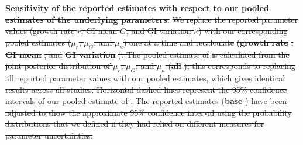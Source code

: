 \documentclass[12pt]{article}
\newcommand{\Ro}{\ensuremath{{\mathcal R}_{0}}\xspace}
\providecommand{\DIFdeltex}[1]{{\protect\color{red}\sout{#1}}}                      %
\providecommand{\DIFdelbegin}{} %
\providecommand{\DIFdelFL}[1]{\DIFdel{#1}} %
\providecommand{\DIFdel}[1]{\texorpdfstring{\DIFdeltex{#1}}{}} %
\newcommand{\DIFscaledelfig}{0.5}
\newlength{\DIFdelgraphicswidth} %
\newlength{\DIFdelgraphicsheight} %
\newcommand{\DIFdelincludegraphics}[2][]{%
\sbox{\DIFdelgraphicsbox}{\DIFOincludegraphics[#1]{#2}}%
\settoboxwidth{\DIFdelgraphicswidth}{\DIFdelgraphicsbox} %
\settoboxtotalheight{\DIFdelgraphicsheight}{\DIFdelgraphicsbox} %
\scalebox{\DIFscaledelfig}{%
\parbox[b]{\DIFdelgraphicswidth}{\usebox{\DIFdelgraphicsbox}\\[-\baselineskip] \rule{\DIFdelgraphicswidth}{0em}}\llap{\resizebox{\DIFdelgraphicswidth}{\DIFdelgraphicsheight}{%
\setlength{\unitlength}{\DIFdelgraphicswidth}%
\begin{picture}(1,1)%
\thicklines\linethickness{2pt} %
{\color[rgb]{1,0,0}\put(0,0){\framebox(1,1){}}}%
{\color[rgb]{1,0,0}\put(0,0){\line( 1,1){1}}}%
{\color[rgb]{1,0,0}\put(0,1){\line(1,-1){1}}}%
\end{picture}%
}\hspace*{3pt}}} %
} %
\DeclareRobustCommand{\DIFdelbegin}{\DIFOdelbegin \let\includegraphics\DIFdelincludegraphics} %
\begin{document}
\DIFdelbegin %
{%
\textbf{\DIFdelFL{Sensitivity of the reported }%
\DIFdelFL{estimates with respect to our pooled estimates of the underlying parameters.}}
\DIFdelFL{We replace the reported parameter values (growth rate $r$, GI mean $\bar G$, and GI variation $\kappa$) with our corresponding pooled estimates ($\mu_r$, $\mu_G$, and $\mu_\kappa$) one at a time and recalculate }%
\DIFdelFL{(}\textbf{\DIFdelFL{growth rate}}%
\DIFdelFL{, }\textbf{\DIFdelFL{GI mean}}%
\DIFdelFL{, and }\textbf{\DIFdelFL{GI variation}}%
\DIFdelFL{).
The pooled estimate of }%
\DIFdelFL{is calculated from the joint posterior distribution of $\mu_r$, $\mu_G$, and $\mu_\kappa$ (}\textbf{\DIFdelFL{all}}%
\DIFdelFL{);
this corresponds to replacing all reported parameter values with our pooled estimates, which gives identical results across all studies.
Horizontal dashed lines represent the 95\% confidence intervals of our pooled estimate of }%
\DIFdelFL{.
The reported }%
\DIFdelFL{estimates (}\textbf{\DIFdelFL{base}}%
\DIFdelFL{) have been adjusted to show the approximate 95\% confidence interval using the probability distributions that we defined if they had relied on different measures for parameter uncertainties.
}}
\end{document}
